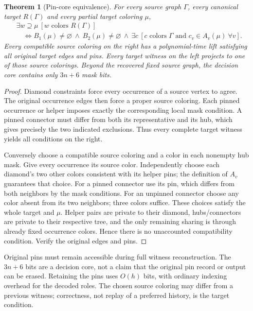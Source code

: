 \documentclass[11pt]{article}
\newtheorem{theorem}{Theorem}
\begin{document}
\begin{theorem}[Pin-core equivalence]\label{thm:pin}
For every source graph $\Gamma$, every canonical target $R(\Gamma)$ and
every partial target coloring $\mu$,
\[
 \begin{split}
 &\exists w\supseteq\mu\ [w\text{ colors }R(\Gamma)]\\
 &\quad\iff B_1(\mu)\ne\varnothing\ \land\ B_2(\mu)\ne\varnothing\ \land\
 \exists c\ [c\text{ colors }\Gamma\text{ and }c_v\in A_v(\mu)\ \forall v].
 \end{split}
\]
Every compatible source coloring on the right has a polynomial-time lift
satisfying \emph{all} original target edges and pins. Every target witness
on the left projects to one of those source colorings. Beyond the recovered
fixed source graph, the decision core contains only $3n+6$ mask bits.
\end{theorem}
\begin{proof}
Diamond constraints force every occurrence of a source vertex to agree.
The original occurrence edges then force a proper source coloring. Each
pinned occurrence or helper imposes exactly the corresponding local mask
condition. A pinned connector must differ from both its representative and
its hub, which gives precisely the two indicated exclusions. Thus every
complete target witness yields all conditions on the right.

Conversely choose a compatible source coloring and a color in each nonempty
hub mask. Give every occurrence its source color. Independently choose each
diamond's two other colors consistent with its helper pins; the definition
of $A_v$ guarantees that choice. For a pinned connector use its pin, which
differs from both neighbors by the mask conditions. For an unpinned connector
choose any color absent from its two neighbors; three colors suffice. These
choices satisfy the whole target and $\mu$. Helper pairs are private to their
diamond, hubs/connectors are private to their respective tree, and the only
remaining sharing is through already fixed occurrence colors. Hence there
is no unaccounted compatibility condition. Verify the original edges and pins.
\end{proof}

Original pins must remain accessible during full witness reconstruction.
The $3n+6$ bits are a decision core, not a claim that the original pin record
or output can be erased. Retaining the pins uses $O(h)$ bits, with ordinary
indexing overhead for the decoded roles. The chosen source coloring may
differ from a previous witness; correctness, not replay of a preferred
history, is the target condition.
\end{document}
